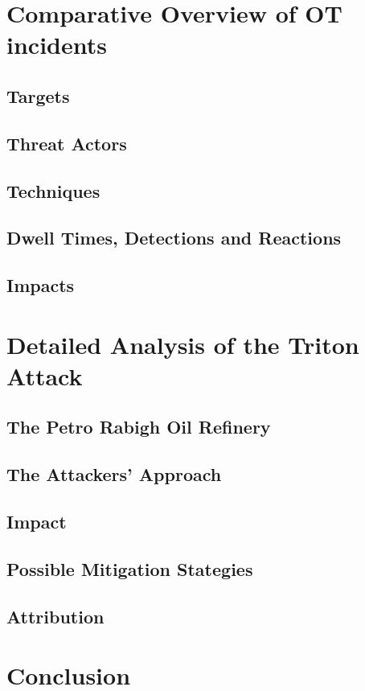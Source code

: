 \documentclass[runningheads]{llncs}
\begin{document}
\section{Comparative Overview of OT incidents}
\subsection{Targets}
\subsection{Threat Actors}
\subsection{Techniques}
\subsection{Dwell Times, Detections and Reactions}
\subsection{Impacts}
\section{Detailed Analysis of the Triton Attack}
\subsection{The Petro Rabigh Oil Refinery}
\subsection{The Attackers' Approach}
\subsection{Impact}
\subsection{Possible Mitigation Stategies}
\subsection{Attribution}
\section{Conclusion}
%
%
%


\end{document}
